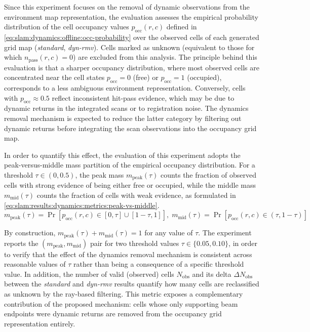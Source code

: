 Since this experiment focuses on the removal of dynamic observations from
the environment map representation, the evaluation assesses the empirical
probability distribution of the cell occupancy values $p_{\mathrm{occ}}(r,c)$
defined in \eqref{eq:slam:dynamics:offline:occ-probability} over the observed
cells of each generated grid map (\emph{standard}, \emph{dyn-rmv}).
Cells marked as unknown (equivalent to those for which
$n_{\mathrm{pass}}(r,c) = 0$) are excluded from this analysis.
The principle behind this evaluation is that a sharper occupancy distribution,
where most observed cells are concentrated near the cell states
$p_{\mathrm{occ}} = 0$ (free) or $p_{\mathrm{occ}} = 1$ (occupied), corresponds
to a less ambiguous environment representation. Conversely, cells with
$p_{\mathrm{occ}} \approx 0.5$ reflect inconsistent hit-pass evidence,
which may be due to dynamic returns in the integrated scans or to
registration noise. The dynamics removal mechanism is expected to
reduce the latter category by filtering out dynamic returns before
integrating the scan observations into the occupancy grid map.

In order to quantify this effect, the evaluation of this experiment adopts the
peak-versus-middle mass partition of the empirical occupancy distribution.
For a threshold $\tau \in (0, 0.5)$, the peak mass $m_{\mathrm{peak}}(\tau)$
counts the fraction of observed cells with strong evidence of being either
free or occupied, while the middle mass $m_{\mathrm{mid}}(\tau)$ counts
the fraction of cells with weak evidence, as formulated in
\eqref{eq:slam:results:dynamics:metrics:peak-vs-middle}.
\begin{equation}
\label{eq:slam:results:dynamics:metrics:peak-vs-middle}
m_{\mathrm{peak}}(\tau) =
\Pr\!\left[p_{\mathrm{occ}}(r,c) \in
           \left[0,\tau\right] \cup \left[1-\tau, 1\right]\right],
\;
m_{\mathrm{mid}}(\tau) =
\Pr\!\left[p_{\mathrm{occ}}(r,c) \in
           \left(\tau, 1-\tau\right)\right]
\end{equation}

By construction, $m_{\mathrm{peak}}(\tau) + m_{\mathrm{mid}}(\tau) = 1$
for any value of $\tau$. The experiment reports the
$(m_{\mathrm{peak}}, m_{\mathrm{mid}})$ pair for two threshold values
$\tau \in \{0.05, 0.10\}$, in order to verify that the effect of the
dynamics removal mechanism is consistent across reasonable values of
$\tau$ rather than being a consequence of a specific threshold value.
In addition, the number of valid (observed) cells $N_{\mathrm{obs}}$
and its delta $\Delta N_{\mathrm{obs}}$ between the \emph{standard} and
\emph{dyn-rmv} results quantify how many cells are reclassified as
unknown by the ray-based filtering. This metric exposes a
complementary contribution of the proposed mechanism: cells whose only
supporting beam endpoints were dynamic returns are removed from the
occupancy grid representation entirely.

